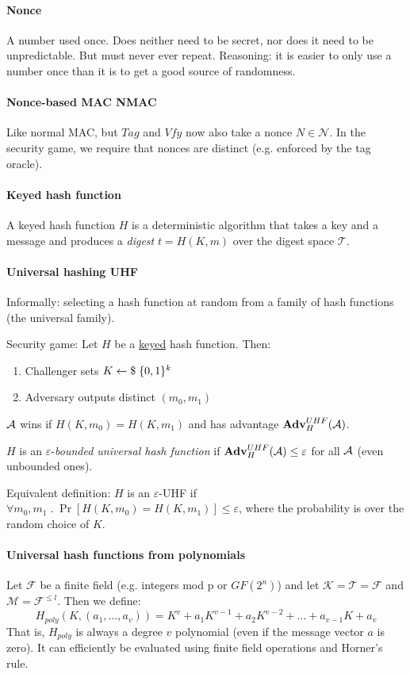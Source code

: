 \paragraph{Nonce}
A number used once.
Does neither need to be secret, nor does it need to be unpredictable.
But must never ever repeat.
Reasoning: it is easier to only use a number once than it is to get a good source of randomness.

\paragraph{Nonce-based MAC NMAC}
Like normal MAC, but $Tag$ and $Vfy$ now also take a nonce $N \in \mathcal{N}$.
In the security game, we require that nonces are distinct (e.g. enforced by the tag oracle).

\paragraph{Keyed hash function}
A keyed hash function $H$ is a deterministic algorithm that takes a key and a message and produces a \emph{digest} $t=H(K, m)$ over the digest space $\mathcal{T}$.

\paragraph{Universal hashing UHF}
Informally: selecting a hash function at random from a family of hash functions (the universal family).

Security game:
Let $H$ be a \underline{keyed} hash function. Then:
\begin{enumerate}
\item Challenger sets $K \leftarrow \$ \; \lbrace 0, 1 \rbrace^k$
\item Adversary outputs distinct $(m_0, m_1)$
\end{enumerate}
$\mathcal{A}$ wins if $H(K, m_0) = H(K, m_1)$ and has advantage $\mathbf{Adv}^{UHF}_{H}(\mathcal{A})$.

$H$ is an $\varepsilon$-\emph{bounded universal hash function} if $\mathbf{Adv}^{UHF}_{H}(\mathcal{A}) \leq \varepsilon$ for all $\mathcal{A}$ (even unbounded ones).

Equivalent definition:
$H$ is an $\varepsilon$-UHF if
$ \forall m_0, m_1 \; . \; \Pr[H(K, m_0) = H(K, m_1)] \leq \varepsilon $,
where the probability is over the random choice of $K$.

\paragraph{Universal hash functions from polynomials}
Let $\mathcal{F}$ be a finite field (e.g. integers mod p or $GF(2^n)$)
and let $\mathcal{K} = \mathcal{T} = \mathcal{F}$ and $\mathcal{M} = \mathcal{F}^{\leq l}$.
Then we define:
$$
H_{poly}(K, (a_1, \dots, a_v))
= K^v + a_1 K^{v-1} + a_2 K^{v-2} + \dots + a_{v-1} K + a_v
$$
That is, $H_{poly}$ is always a degree $v$ polynomial (even if the message vector $a$ is zero).
It can efficiently be evaluated using finite field operations and Horner's rule.

